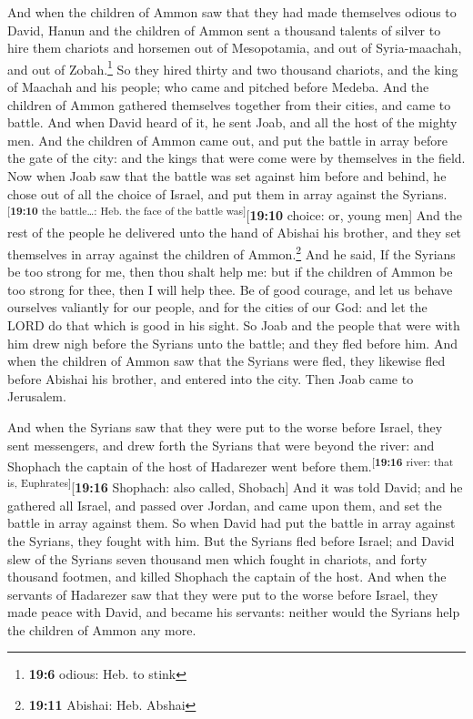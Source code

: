  And when the children of Ammon saw that they had made
themselves odious to David, Hanun and the children of Ammon sent a
thousand talents of silver to hire them chariots and horsemen out of
Mesopotamia, and out of Syria-maachah, and out of Zobah.\footnote{\textbf{19:6}
  odious: Heb. to stink}  So they hired thirty and two
thousand chariots, and the king of Maachah and his people; who came and
pitched before Medeba. And the children of Ammon gathered themselves
together from their cities, and came to battle.  And when
David heard of it, he sent Joab, and all the host of the mighty men.
 And the children of Ammon came out, and put the battle in
array before the gate of the city: and the kings that were come were by
themselves in the field.  Now when Joab saw that the
battle was set against him before and behind, he chose out of all the
choice of Israel, and put them in array against the
Syrians.\textsuperscript{{[}\textbf{19:10} the battle\ldots: Heb. the
face of the battle was{]}}{[}\textbf{19:10} choice: or, young men{]}
 And the rest of the people he delivered unto the hand of
Abishai his brother, and they set themselves in array against the
children of Ammon.\footnote{\textbf{19:11} Abishai: Heb. Abshai}
 And he said, If the Syrians be too strong for me, then
thou shalt help me: but if the children of Ammon be too strong for thee,
then I will help thee.  Be of good courage, and let us
behave ourselves valiantly for our people, and for the cities of our
God: and let the LORD do that which is good in his sight.
 So Joab and the people that were with him drew nigh
before the Syrians unto the battle; and they fled before him.
 And when the children of Ammon saw that the Syrians were
fled, they likewise fled before Abishai his brother, and entered into
the city. Then Joab came to Jerusalem.

 And when the Syrians saw that they were put to the worse
before Israel, they sent messengers, and drew forth the Syrians that
were beyond the river: and Shophach the captain of the host of Hadarezer
went before them.\textsuperscript{{[}\textbf{19:16} river: that is,
Euphrates{]}}{[}\textbf{19:16} Shophach: also called, Shobach{]}
 And it was told David; and he gathered all Israel, and
passed over Jordan, and came upon them, and set the battle in array
against them. So when David had put the battle in array against the
Syrians, they fought with him.  But the Syrians fled
before Israel; and David slew of the Syrians seven thousand men which
fought in chariots, and forty thousand footmen, and killed Shophach the
captain of the host.  And when the servants of Hadarezer
saw that they were put to the worse before Israel, they made peace with
David, and became his servants: neither would the Syrians help the
children of Ammon any more.

